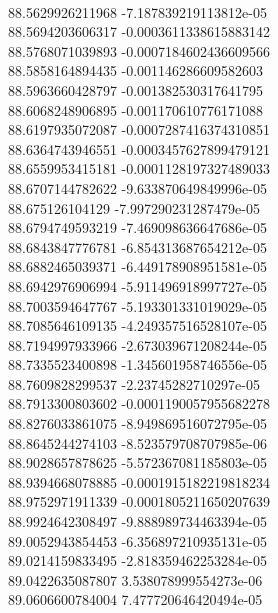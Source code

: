 { \\
88.5629926211968 -7.187839219113812e-05
 \\
88.5694203606317 -0.0003611338615883142
 \\
88.5768071039893 -0.0007184602436609566
 \\
88.5858164894435 -0.001146286609582603
 \\
88.5963660428797 -0.001382530317641795
 \\
88.6068248906895 -0.001170610776171088
 \\
88.6197935072087 -0.0007287416374310851
 \\
88.6364743946551 -0.0003457627899479121
 \\
88.6559953415181 -0.0001128197327489033
 \\
88.6707144782622 -9.633870649849996e-05
 \\
88.675126104129 -7.997290231287479e-05
 \\
88.6794749593219 -7.469098636647686e-05
 \\
88.6843847776781 -6.854313687654212e-05
 \\
88.6882465039371 -6.449178908951581e-05
 \\
88.6942976906994 -5.911496918997727e-05
 \\
88.7003594647767 -5.193301331019029e-05
 \\
88.7085646109135 -4.249357516528107e-05
 \\
88.7194997933966 -2.673039671208244e-05
 \\
88.7335523400898 -1.345601958746556e-05
 \\
88.7609828299537 -2.23745282710297e-05
 \\
88.7913300803602 -0.0001190057955682278
 \\
88.8276033861075 -8.949869516072795e-05
 \\
88.8645244274103 -8.523579708707985e-06
 \\
88.9028657878625 -5.572367081185803e-05
 \\
88.9394668078885 -0.0001915182219818234
 \\
88.9752971911339 -0.0001805211650207639
 \\
88.9924642308497 -9.888989734463394e-05
 \\
89.0052943854453 -6.356897210935131e-05
 \\
89.0214159833495 -2.818359462253284e-05
 \\
89.0422635087807 3.538078999554273e-06
 \\
89.0606600784004 7.477720646420494e-05
 \\
}
